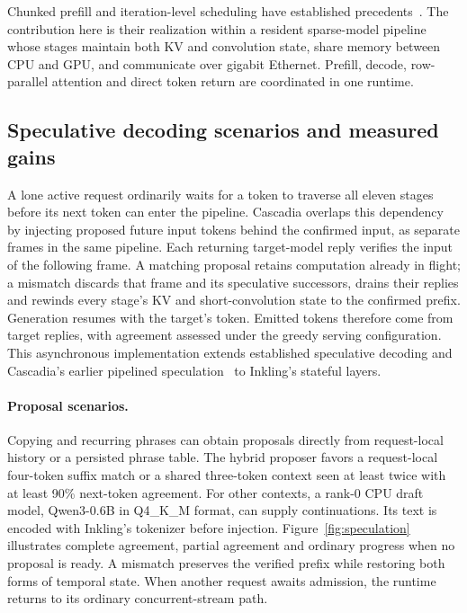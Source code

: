 \documentclass[11pt]{article}
\begin{document}
Chunked prefill and iteration-level scheduling have established precedents~\cite{orca,sarathi,sarathiserve}. The contribution here is their realization within a resident sparse-model pipeline whose stages maintain both KV and convolution state, share memory between CPU and GPU, and communicate over gigabit Ethernet. Prefill, decode, row-parallel attention and direct token return are coordinated in one runtime.

\subsection{Speculative decoding scenarios and measured gains}
\label{sec:speculation}
A lone active request ordinarily waits for a token to traverse all eleven stages before its next token can enter the pipeline. Cascadia overlaps this dependency by injecting proposed future input tokens behind the confirmed input, as separate frames in the same pipeline. Each returning target-model reply verifies the input of the following frame. A matching proposal retains computation already in flight; a mismatch discards that frame and its speculative successors, drains their replies and rewinds every stage's KV and short-convolution state to the confirmed prefix. Generation resumes with the target's token. Emitted tokens therefore come from target replies, with agreement assessed under the greedy serving configuration. This asynchronous implementation extends established speculative decoding and Cascadia's earlier pipelined speculation~\cite{specdecode,shards} to Inkling's stateful layers.

\paragraph{Proposal scenarios.}
Copying and recurring phrases can obtain proposals directly from request-local history or a persisted phrase table. The hybrid proposer favors a request-local four-token suffix match or a shared three-token context seen at least twice with at least 90\% next-token agreement. For other contexts, a rank-0 CPU draft model, Qwen3-0.6B in Q4\_K\_M format, can supply continuations. Its text is encoded with Inkling's tokenizer before injection. Figure~\ref{fig:speculation} illustrates complete agreement, partial agreement and ordinary progress when no proposal is ready. A mismatch preserves the verified prefix while restoring both forms of temporal state. When another request awaits admission, the runtime returns to its ordinary concurrent-stream path.
\end{document}

